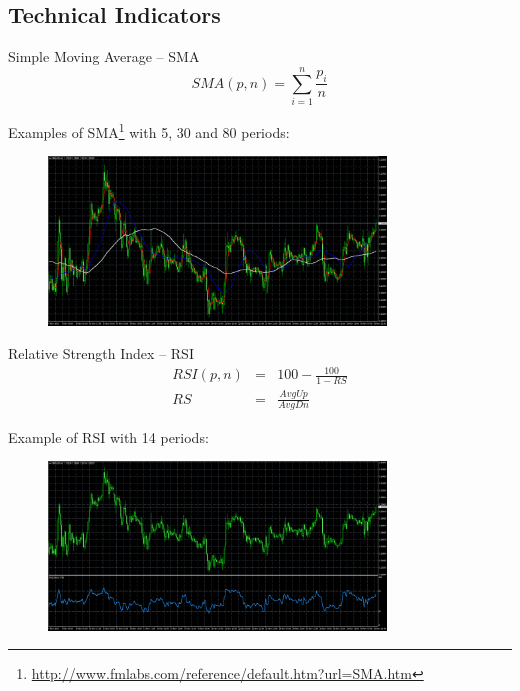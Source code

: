 \documentclass[12pt,portuguese]{beamer}
\begin{document}
\subsection{Technical Indicators}
\begin{frame}{Simple Moving Average -- SMA}
	$$SMA(p,n) = \sum_{i=1}^n \frac{p_i}{n}$$

	Examples of SMA\footnote{\url{http://www.fmlabs.com/reference/default.htm?url=SMA.htm}} with 5, 30 and 80 periods:
	\begin{figure}[H]
	\centering
	\includegraphics[width=0.8\textwidth]{images/mt4_SMA.png}
	\end{figure}
\end{frame}

\begin{frame}{Relative Strength Index -- RSI}
\begin{equation*}
\begin{array}{rcl}
RSI(p,n) & = & 100 - \frac{100}{1-RS}
\\
RS & = & \frac{AvgUp}{AvgDn}
\end{array}
\end{equation*}

	Example of RSI\citep{WilderJr1978} with 14 periods:
	\begin{figure}[H]
	\centering
	\includegraphics[width=0.8\textwidth]{images/mt4_RSI.png}
	\end{figure}
\end{frame}
\end{document}
